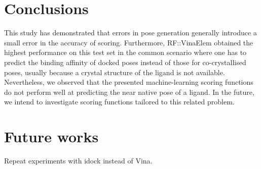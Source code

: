 \section{Conclusions}

This study has demonstrated that errors in pose generation generally introduce a small error in the accuracy of scoring. Furthermore, RF::VinaElem obtained the highest performance on this test set in the common scenario where one has to predict the binding affinity of docked poses instead of those for co-crystallised poses, usually because a crystal structure of the ligand is not available. Nevertheless, we observed that the presented machine-learning scoring functions do not perform well at predicting the near native pose of a ligand. In the future, we intend to investigate scoring functions tailored to this related problem.

\section{Future works}

Repeat experiments with idock instead of Vina.

\chapterend

